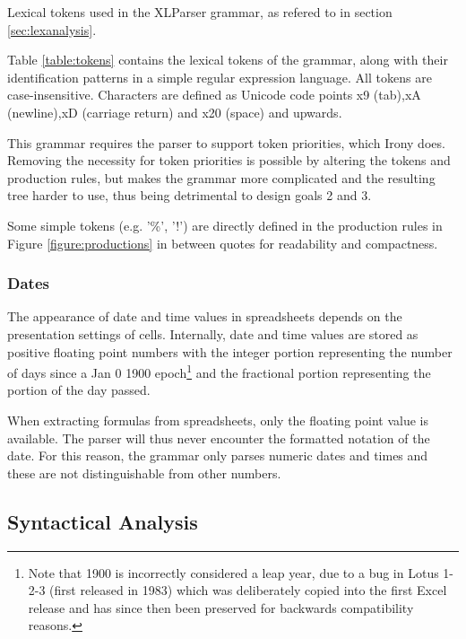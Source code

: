 \begin{table}
\tiny
\centerfloat

\caption{Lexical tokens used in the XLParser grammar, as refered to in section \ref{sec:lexanalysis}.}
\label{table:tokens}
\end{table}

Table \ref{table:tokens} contains the lexical tokens of the grammar, along with their identification patterns in a simple regular expression language. All tokens are case-insensitive.
Characters are defined as Unicode code points x9 (tab),xA (newline),xD (carriage return) and x20 (space) and upwards.

This grammar requires the parser to support token priorities, which Irony does.
Removing the necessity for token priorities is possible by altering the tokens and production rules, but makes the grammar more complicated and the resulting tree harder to use, thus being detrimental to design goals 2 and 3.

Some simple tokens (e.g. '\%', '!') are directly defined in the production rules in Figure \ref{figure:productions} in between quotes for readability and compactness.

\subsubsection{\textbf{Dates}}

The appearance of date and time values in spreadsheets depends on the presentation settings of cells. Internally, date and time values are stored as positive floating point numbers with the integer portion representing the number of days since a Jan 0 1900 epoch\footnote{Note that 1900 is incorrectly considered a leap year, due to a bug in Lotus 1-2-3 (first released in 1983) which was deliberately copied into the first Excel release and has since then been preserved for backwards compatibility reasons.} and the fractional portion representing the portion of the day passed.

When extracting formulas from spreadsheets, only the floating point value is available.
The parser will thus never encounter the formatted notation of the date.
For this reason, the grammar only parses numeric dates and times and these are not distinguishable from other numbers.

\newpage

\subsection{Syntactical Analysis}

